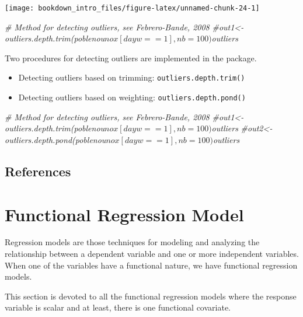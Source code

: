 \documentclass[
]{book}
\newenvironment{Shaded}{\begin{snugshade}}{\end{snugshade}}
\newcommand{\CommentTok}[1]{\textcolor[rgb]{0.56,0.35,0.01}{\textit{#1}}}
\begin{document}
\begin{center}\texttt{[image: bookdown\_intro\_files/figure-latex/unnamed-chunk-24-1]} \end{center}

\begin{Shaded}
\begin{Highlighting}[]
\CommentTok{\# Method for detecting outliers, see Febrero{-}Bande, 2008}
\CommentTok{\#out1\textless{}{-}outliers.depth.trim(poblenou$nox[dayw == 1],nb=100)$outliers}
\end{Highlighting}
\end{Shaded}

Two procedures for detecting outliers are implemented in the package. \citep{Febrero2008}

\begin{itemize}
\item
  Detecting outliers based on trimming: \texttt{outliers.depth.trim()}
\item
  Detecting outliers based on weighting: \texttt{outliers.depth.pond()}
\end{itemize}

\begin{Shaded}
\begin{Highlighting}[]
\CommentTok{\# Method for detecting outliers, see Febrero{-}Bande, 2008}
\CommentTok{\#out1\textless{}{-}outliers.depth.trim(poblenou$nox[dayw == 1],nb=100)$outliers}
\CommentTok{\#out2\textless{}{-}outliers.depth.pond(poblenou$nox[dayw == 1],nb=100)$outliers}
\end{Highlighting}
\end{Shaded}

\hypertarget{references}{%
\section{References}\label{references}}

\hypertarget{regression}{%
\chapter{Functional Regression Model}\label{regression}}

Regression models are those techniques for modeling and analyzing the relationship between a dependent variable and one or more independent variables. When one of the variables have a functional nature, we have functional regression models.

This section is devoted to all the functional regression models where the response variable is scalar and at least, there is one functional covariate.
\end{document}
